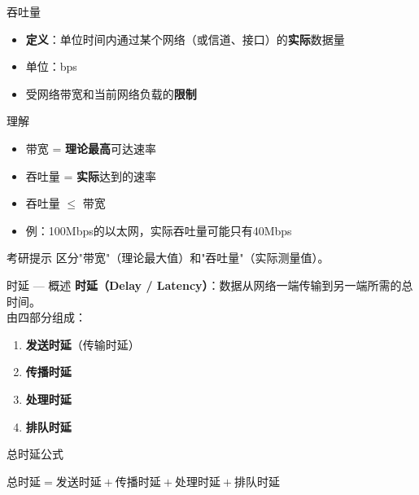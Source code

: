\documentclass[10pt, aspectratio=169]{beamer}
\begin{document}
\begin{frame}{吞吐量}
    \begin{itemize}
        \item \textbf{定义}：单位时间内通过某个网络（或信道、接口）的\textbf{实际}数据量
        \item 单位：bps
        \item 受网络带宽和当前网络负载的\textbf{限制}
    \end{itemize}
    \vspace{0.5em}
    \begin{exampleblock}{理解}
        \begin{itemize}
            \item 带宽 = \textbf{理论最高}可达速率
            \item 吞吐量 = \textbf{实际}达到的速率
            \item 吞吐量 $\le$ 带宽
            \item 例：100Mbps的以太网，实际吞吐量可能只有40Mbps
        \end{itemize}
    \end{exampleblock}
    \vspace{0.3em}
    \begin{block}{考研提示}
        区分"带宽"（理论最大值）和"吞吐量"（实际测量值）。
    \end{block}
\end{frame}

\begin{frame}{时延 --- 概述}
    \textbf{时延（Delay / Latency）}：数据从网络一端传输到另一端所需的总时间。\\
    \vspace{0.3em}
    由四部分组成：
    \begin{enumerate}
        \item \textbf{发送时延}（传输时延）
        \item \textbf{传播时延}
        \item \textbf{处理时延}
        \item \textbf{排队时延}
    \end{enumerate}
    \vspace{0.5em}
    \begin{block}{总时延公式}
        \begin{center}
            \Large
            $\text{总时延} = \text{发送时延} + \text{传播时延} + \text{处理时延} + \text{排队时延}$
        \end{center}
    \end{block}
\end{frame}
\end{document}
